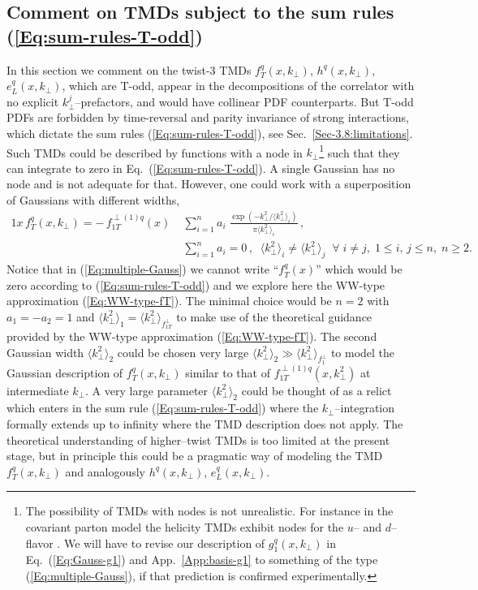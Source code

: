 \documentclass[a4paper,11pt]{article}
\newcommand{\la}{\langle}
\newcommand{\ra}{\rangle}
\def\kperp{k_\perp}
\begin{document}
\subsection{Comment on TMDs subject to the sum rules (\ref{Eq:sum-rules-T-odd})}
\label{App-B:comment-Todd-twist-3}

In this section we comment on the twist-3 TMDs
$f_T^q(x,\kperp)$,  $h^q(x,\kperp)$, $e_L^q(x,\kperp)$,
which are T-odd, appear in the decompositions of the correlator with no
explicit $k_\perp^j$--prefactors, and would have collinear PDF counterparts.
But T-odd PDFs are forbidden by time-reversal and parity invariance of
strong interactions, which dictate the sum rules (\ref{Eq:sum-rules-T-odd}),
see Sec.~\ref{Sec-3.8:limitations}.
Such TMDs could be described by functions with a node in
$k_\perp$\footnote{The possibility of TMDs with nodes is not unrealistic.
	For instance in the covariant parton model the helicity TMDs
	exhibit nodes for the $u$-- and $d$--flavor \cite{Efremov:2010mt}.
	We will have to revise our description of $g_1^q(x,\kperp)$
	in Eq.~(\ref{Eq:Gauss-g1}) and App.~\ref{App:basis-g1} to something
	of the type (\ref{Eq:multiple-Gauss}), if that prediction is
	confirmed experimentally. }
such that they can integrate to zero in Eq.~(\ref{Eq:sum-rules-T-odd}).
A single Gaussian has no node and is not adequate for that.
However, one could work with a superposition of Gaussians
with different widths,
\begin{alignat}{1}
	x \, f_T^q(x,\kperp) =  - \, f_{1T}^{\perp (1)q}(x)\;
	&\sum\limits_{i=1}^{n} a_i\;
	\frac{\exp(-\kperp^2/\la\kperp^2\ra_i^{ })}{\pi\la\kperp^2\ra_i^{ }}\,,
	\label{Eq:multiple-Gauss}\\
	&\sum\limits_{i=1}^n a_i = 0\,, \;\;
	\la\kperp^2\ra_i^{ }\neq\la\kperp^2\ra_j^{ }\;\;\forall\;i\neq j,
	\; 1\le i,\,j\le n,\;n\ge 2.\nonumber
\end{alignat}
Notice that in (\ref{Eq:multiple-Gauss}) we cannot write ``$f_T^q(x)$''
which would be zero according to (\ref{Eq:sum-rules-T-odd}) and we
explore here the WW-type approximation (\ref{Eq:WW-type-fT}).
The minimal choice would be $n=2$ with $a_1=-a_2=1$ and
$\la\kperp^2\ra_1^{ } = \la\kperp^2\ra_{f_{1T}^\perp}$ to make use
of the theoretical guidance provided by the WW-type approximation
(\ref{Eq:WW-type-fT}).
The second Gaussian width $\la\kperp^2\ra_2^{ }$ could be chosen
very large $\la\kperp^2\ra_2^{ } \gg \la\kperp^2\ra_{f_1^\perp}$ to
model the Gaussian description of $f_T^{q}(x,\kperp)$ similar to
that of $f_{1T}^{\perp(1)q}(x,\kperp^2)$ at intermediate $\kperp$.
A very large parameter $\la\kperp^2\ra_2^{ }$ could be thought of as
a relict which enters in the sum rule (\ref{Eq:sum-rules-T-odd})
where the $\kperp$--integration formally extends up to infinity
where the TMD description does not apply. The theoretical
understanding of higher--twist TMDs is too limited at
the present stage, but in principle this could be a
pragmatic way of modeling the TMD $f_T^q(x,\kperp)$
and analogously $h^q(x,\kperp)$, $e_L^q(x,\kperp)$.
\end{document}
